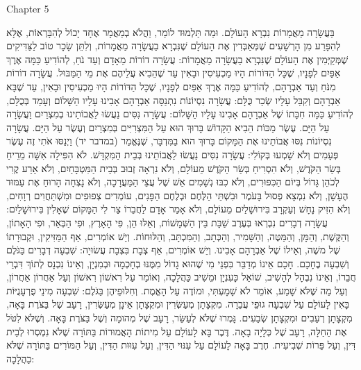 Chapter 5

בַּעֲשָׂרָה מַאֲמָרוֹת נִבְרָא הָעוֹלָם. וּמַה תַּלְמוּד לוֹמַר, וַהֲלֹא בְמַאֲמָר אֶחָד יָכוֹל לְהִבָּרְאוֹת, אֶלָּא לְהִפָּרַע מִן הָרְשָׁעִים שֶׁמְּאַבְּדִין אֶת הָעוֹלָם שֶׁנִּבְרָא בַעֲשָׂרָה מַאֲמָרוֹת, וְלִתֵּן שָׂכָר טוֹב לַצַּדִּיקִים שֶׁמְּקַיְּמִין אֶת הָעוֹלָם שֶׁנִּבְרָא בַעֲשָׂרָה מַאֲמָרוֹת:
עֲשָׂרָה דוֹרוֹת מֵאָדָם וְעַד נֹחַ, לְהוֹדִיעַ כַּמָּה אֶרֶךְ אַפַּיִם לְפָנָיו, שֶׁכָּל הַדּוֹרוֹת הָיוּ מַכְעִיסִין וּבָאִין עַד שֶׁהֵבִיא עֲלֵיהֶם אֶת מֵי הַמַּבּוּל. עֲשָׂרָה דוֹרוֹת מִנֹּחַ וְעַד אַבְרָהָם, לְהוֹדִיעַ כַּמָּה אֶרֶךְ אַפַּיִם לְפָנָיו, שֶׁכָּל הַדּוֹרוֹת הָיוּ מַכְעִיסִין וּבָאִין, עַד שֶׁבָּא אַבְרָהָם וְקִבֵּל עָלָיו שְׂכַר כֻּלָּם:
עֲשָׂרָה נִסְיוֹנוֹת נִתְנַסָּה אַבְרָהָם אָבִינוּ עָלָיו הַשָּׁלוֹם וְעָמַד בְּכֻלָּם, לְהוֹדִיעַ כַּמָּה חִבָּתוֹ שֶׁל אַבְרָהָם אָבִינוּ עָלָיו הַשָּׁלוֹם:
עֲשָׂרָה נִסִּים נַעֲשׂוּ לַאֲבוֹתֵינוּ בְמִצְרַיִם וַעֲשָׂרָה עַל הַיָּם. עֶשֶׂר מַכּוֹת הֵבִיא הַקָּדוֹשׁ בָּרוּךְ הוּא עַל הַמִּצְרִיִּים בְּמִצְרַיִם וְעֶשֶׂר עַל הַיָּם. עֲשָׂרָה נִסְיוֹנוֹת נִסּוּ אֲבוֹתֵינוּ אֶת הַמָּקוֹם בָּרוּךְ הוּא בַמִּדְבָּר, שֶׁנֶּאֱמַר (במדבר יד) וַיְנַסּוּ אֹתִי זֶה עֶשֶׂר פְּעָמִים וְלֹא שָׁמְעוּ בְּקוֹלִי:
עֲשָׂרָה נִסִּים נַעֲשׂוּ לַאֲבוֹתֵינוּ בְּבֵית הַמִּקְדָּשׁ. לֹא הִפִּילָה אִשָּׁה מֵרֵיחַ בְּשַׂר הַקֹּדֶשׁ, וְלֹא הִסְרִיחַ בְּשַׂר הַקֹּדֶשׁ מֵעוֹלָם, וְלֹא נִרְאָה זְבוּב בְּבֵית הַמִּטְבָּחַיִם, וְלֹא אֵרַע קֶרִי לְכֹהֵן גָּדוֹל בְּיוֹם הַכִּפּוּרִים, וְלֹא כִבּוּ גְשָׁמִים אֵשׁ שֶׁל עֲצֵי הַמַּעֲרָכָה, וְלֹא נָצְחָה הָרוּחַ אֶת עַמּוּד הֶעָשָׁן, וְלֹא נִמְצָא פְסוּל בָּעֹמֶר וּבִשְׁתֵּי הַלֶּחֶם וּבְלֶחֶם הַפָּנִים, עוֹמְדִים צְפוּפִים וּמִשְׁתַּחֲוִים רְוָחִים, וְלֹא הִזִּיק נָחָשׁ וְעַקְרָב בִּירוּשָׁלַיִם מֵעוֹלָם, וְלֹא אָמַר אָדָם לַחֲבֵרוֹ צַר לִי הַמָּקוֹם שֶׁאָלִין בִּירוּשָׁלַיִם:
עֲשָׂרָה דְבָרִים נִבְרְאוּ בְּעֶרֶב שַׁבָּת בֵּין הַשְּׁמָשׁוֹת, וְאֵלּוּ הֵן, פִּי הָאָרֶץ, וּפִי הַבְּאֵר, וּפִי הָאָתוֹן, וְהַקֶּשֶׁת, וְהַמָּן, וְהַמַּטֶּה, וְהַשָּׁמִיר, וְהַכְּתָב, וְהַמִּכְתָּב, וְהַלּוּחוֹת. וְיֵשׁ אוֹמְרִים, אַף הַמַּזִּיקִין, וּקְבוּרָתוֹ שֶׁל משֶׁה, וְאֵילוֹ שֶׁל אַבְרָהָם אָבִינוּ. וְיֵשׁ אוֹמְרִים, אַף צְבָת בִּצְבָת עֲשׂוּיָה:
שִׁבְעָה דְבָרִים בַּגֹּלֶם וְשִׁבְעָה בֶחָכָם. חָכָם אֵינוֹ מְדַבֵּר בִּפְנֵי מִי שֶׁהוּא גָדוֹל מִמֶּנּוּ בְחָכְמָה וּבְמִנְיָן, וְאֵינוֹ נִכְנָס לְתוֹךְ דִּבְרֵי חֲבֵרוֹ, וְאֵינוֹ נִבְהָל לְהָשִׁיב, שׁוֹאֵל כָּעִנְיָן וּמֵשִׁיב כַּהֲלָכָה, וְאוֹמֵר עַל רִאשׁוֹן רִאשׁוֹן וְעַל אַחֲרוֹן אַחֲרוֹן, וְעַל מַה שֶּׁלֹּא שָׁמַע, אוֹמֵר לֹא שָׁמָעְתִּי, וּמוֹדֶה עַל הָאֱמֶת. וְחִלּוּפֵיהֶן בַּגֹּלֶם:
שִׁבְעָה מִינֵי פֻרְעָנֻיּוֹת בָּאִין לָעוֹלָם עַל שִׁבְעָה גוּפֵי עֲבֵרָה. מִקְצָתָן מְעַשְּׂרִין וּמִקְצָתָן אֵינָן מְעַשְּׂרִין, רָעָב שֶׁל בַּצֹּרֶת בָּאָה, מִקְצָתָן רְעֵבִים וּמִקְצָתָן שְׂבֵעִים. גָּמְרוּ שֶׁלֹּא לְעַשֵּׂר, רָעָב שֶׁל מְהוּמָה וְשֶׁל בַּצֹּרֶת בָּאָה. וְשֶׁלֹּא לִטֹּל אֶת הַחַלָּה, רָעָב שֶׁל כְּלָיָה בָאָה. דֶּבֶר בָּא לָעוֹלָם עַל מִיתוֹת הָאֲמוּרוֹת בַּתּוֹרָה שֶׁלֹּא נִמְסְרוּ לְבֵית דִּין, וְעַל פֵּרוֹת שְׁבִיעִית. חֶרֶב בָּאָה לָעוֹלָם עַל עִנּוּי הַדִּין, וְעַל עִוּוּת הַדִּין, וְעַל הַמּוֹרִים בַּתּוֹרָה שֶׁלֹּא כַהֲלָכָה:
